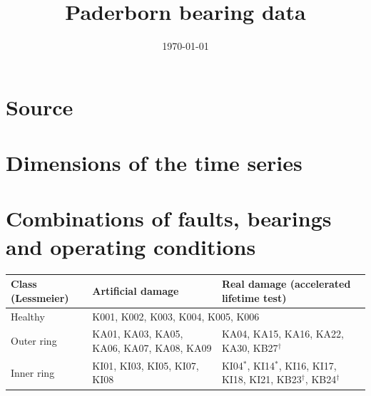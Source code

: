 \documentclass[11pt,a4paper]{article}
\title{Paderborn bearing data}
\author{}
\date{\today}
\begin{document}
\maketitle

\section{Source}

\section{Dimensions of the time series}

\section{Combinations of faults, bearings and operating conditions}

\begin{table}[h]
\centering
\small
\begin{tabular}{lp{5.2cm}p{5.2cm}}
\toprule
Class (Lessmeier) & Artificial damage & Real damage (accelerated lifetime test) \\
\midrule
Healthy    & \multicolumn{2}{l}{K001, K002, K003, K004, K005, K006} \\
Outer ring & KA01, KA03, KA05, KA06, KA07, KA08, KA09 & KA04, KA15, KA16, KA22, KA30, KB27$^\dagger$ \\
Inner ring & KI01, KI03, KI05, KI07, KI08 & KI04$^*$, KI14$^*$, KI16, KI17, KI18, KI21, KB23$^\dagger$, KB24$^\dagger$ \\
\bottomrule
\end{tabular}
\end{table}
\end{document}
